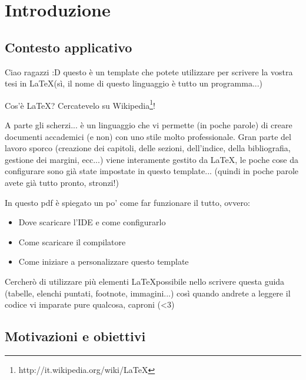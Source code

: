 
\chapter{Introduzione}
\label{chap:Introduzione}


\section{Contesto applicativo}
\label{sec:intro1}

Ciao ragazzi :D questo è un template che potete utilizzare per scrivere la vostra tesi in \LaTeX (sì, il nome di questo linguaggio è tutto un programma...)

Cos'è \LaTeX ? Cercatevelo su Wikipedia\footnote{http://it.wikipedia.org/wiki/LaTeX}!

A parte gli scherzi... è un linguaggio che vi permette (in poche parole) di creare documenti accademici (e non) con uno stile molto professionale. Gran parte del lavoro sporco (creazione dei capitoli, delle sezioni, dell'indice, della bibliografia, gestione dei margini, ecc...) viene interamente gestito da \LaTeX , le poche cose da configurare sono già state impostate in questo template... (quindi in poche parole avete già tutto pronto, stronzi!)

In questo pdf è spiegato un po' come far funzionare il tutto, ovvero:
\begin{itemize}
\item Dove scaricare l'IDE e come configurarlo
\item Come scaricare il compilatore
\item Come iniziare a personalizzare questo template
\end{itemize}

Cercherò di utilizzare più elementi \LaTeX possibile nello scrivere questa guida (tabelle, elenchi puntati, footnote, immagini...) così quando andrete a leggere il codice vi imparate pure qualcosa, caproni (<3)


\section{Motivazioni e obiettivi}
\label{sec:intro2}

